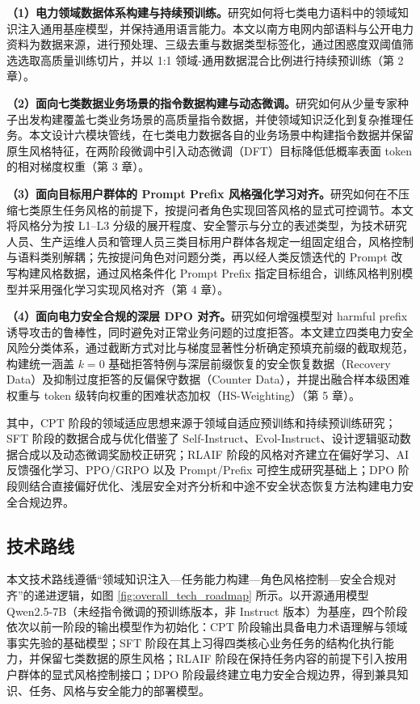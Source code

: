 \documentclass[fontset=fandol,type=master,campus=shenzhen,etitleauto=true]{hithesisbook}
\begin{document}
\textbf{（1）电力领域数据体系构建与持续预训练。}研究如何将七类电力语料中的领域知识注入通用基座模型，并保持通用语言能力。本文以南方电网内部语料与公开电力资料为数据来源，进行预处理、三级去重与数据类型标签化，通过困惑度双阈值筛选选取高质量训练切片，并以 1:1 领域-通用数据混合比例进行持续预训练（第 2 章）。

\textbf{（2）面向七类数据业务场景的指令数据构建与动态微调。}研究如何从少量专家种子出发构建覆盖七类业务场景的高质量指令数据，并使领域知识泛化到复杂推理任务。本文设计六模块管线，在七类电力数据各自的业务场景中构建指令数据并保留原生风格特征，在两阶段微调中引入动态微调（DFT）目标降低低概率表面 token 的相对梯度权重（第 3 章）。

\textbf{（3）面向目标用户群体的 Prompt Prefix 风格强化学习对齐。}研究如何在不压缩七类原生任务风格的前提下，按提问者角色实现回答风格的显式可控调节。本文将风格分为按 L1--L3 分级的展开程度、安全警示与分立的表述类型，为技术研究人员、生产运维人员和管理人员三类目标用户群体各规定一组固定组合，风格控制与语料类别解耦；先按提问角色对问题分类，再以经人类反馈迭代的 Prompt 改写构建风格数据，通过风格条件化 Prompt Prefix 指定目标组合，训练风格判别模型并采用强化学习实现风格对齐（第 4 章）。

\textbf{（4）面向电力安全合规的深层 DPO 对齐。}研究如何增强模型对 harmful prefix 诱导攻击的鲁棒性，同时避免对正常业务问题的过度拒答。本文建立四类电力安全风险分类体系，通过截断方式对比与梯度显著性分析确定预填充前缀的截取规范，构建统一涵盖 $k=0$ 基础拒答特例与深层前缀恢复的安全恢复数据（Recovery Data）及抑制过度拒答的反偏保守数据（Counter Data），并提出融合样本级困难权重与 token 级转向权重的困难状态加权（HS-Weighting）（第 5 章）。

其中，CPT 阶段的领域适应思想来源于领域自适应预训练和持续预训练研究\cite{ref6,ref52}；SFT 阶段的数据合成与优化借鉴了 Self-Instruct、Evol-Instruct、设计逻辑驱动数据合成以及动态微调奖励校正研究\cite{ref24,ref25,ref53,ref54,ref82}；RLAIF 阶段的风格对齐建立在偏好学习、AI 反馈强化学习、PPO/GRPO 以及 Prompt/Prefix 可控生成研究基础上\cite{ref30,ref31,ref32,ref44,ref90,ref33,ref34,ref35,ref36,ref37,ref38,ref39}；DPO 阶段则结合直接偏好优化、浅层安全对齐分析和中途不安全状态恢复方法构建电力安全合规边界\cite{ref40,ref44,ref45,ref46,ref47,ref48,ref83,ref84}。

\subsection{技术路线}

本文技术路线遵循“领域知识注入—任务能力构建—角色风格控制—安全合规对齐”的递进逻辑，如图 \ref{fig:overall_tech_roadmap} 所示。以开源通用模型 Qwen2.5-7B\cite{ref55}（未经指令微调的预训练版本，非 Instruct 版本）为基座，四个阶段依次以前一阶段的输出模型作为初始化：CPT 阶段输出具备电力术语理解与领域事实先验的基础模型；SFT 阶段在其上习得四类核心业务任务的结构化执行能力，并保留七类数据的原生风格；RLAIF 阶段在保持任务内容的前提下引入按用户群体的显式风格控制接口；DPO 阶段最终建立电力安全合规边界，得到兼具知识、任务、风格与安全能力的部署模型。
\end{document}
